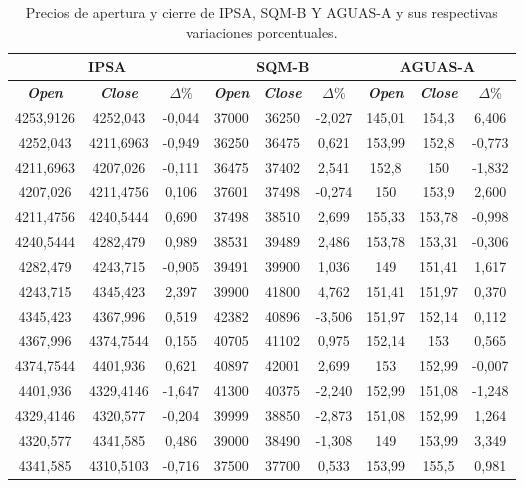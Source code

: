 \documentclass[12pt,letter,spanish]{article}
\begin{document}
\begin{table}[H]
\renewcommand\thetable{A3.1} 
\caption{Precios de apertura y cierre de IPSA, SQM-B Y AGUAS-A y sus respectivas variaciones porcentuales.}
\begin{tabular}{|c|c|c|c|c|c|c|c|c|}
\hline
\multicolumn{3}{|c|}{IPSA} & \multicolumn{3}{c|}{SQM-B} & \multicolumn{3}{c|}{AGUAS-A} \\ \hline
\textit{\textbf{Open}} & \textit{\textbf{Close}} & \textit{\textbf{$\Delta \%$}} & \textit{\textbf{Open}} & \textit{\textbf{Close}} & \textit{\textbf{$\Delta \%$}} & \textit{\textbf{Open}} & \textit{\textbf{Close}} & \textit{\textbf{$\Delta \%$}} \\ \hline
4253,9126 & 4252,043 & -0,044 & 37000 & 36250 & -2,027 & 145,01 & 154,3 & 6,406 \\ \hline
4252,043 & 4211,6963 & -0,949 & 36250 & 36475 & 0,621 & 153,99 & 152,8 & -0,773 \\ \hline
4211,6963 & 4207,026 & -0,111 & 36475 & 37402 & 2,541 & 152,8 & 150 & -1,832 \\ \hline
4207,026 & 4211,4756 & 0,106 & 37601 & 37498 & -0,274 & 150 & 153,9 & 2,600 \\ \hline
4211,4756 & 4240,5444 & 0,690 & 37498 & 38510 & 2,699 & 155,33 & 153,78 & -0,998 \\ \hline
4240,5444 & 4282,479 & 0,989 & 38531 & 39489 & 2,486 & 153,78 & 153,31 & -0,306 \\ \hline
4282,479 & 4243,715 & -0,905 & 39491 & 39900 & 1,036 & 149 & 151,41 & 1,617 \\ \hline
4243,715 & 4345,423 & 2,397 & 39900 & 41800 & 4,762 & 151,41 & 151,97 & 0,370 \\ \hline
4345,423 & 4367,996 & 0,519 & 42382 & 40896 & -3,506 & 151,97 & 152,14 & 0,112 \\ \hline
4367,996 & 4374,7544 & 0,155 & 40705 & 41102 & 0,975 & 152,14 & 153 & 0,565 \\ \hline
4374,7544 & 4401,936 & 0,621 & 40897 & 42001 & 2,699 & 153 & 152,99 & -0,007 \\ \hline
4401,936 & 4329,4146 & -1,647 & 41300 & 40375 & -2,240 & 152,99 & 151,08 & -1,248 \\ \hline
4329,4146 & 4320,577 & -0,204 & 39999 & 38850 & -2,873 & 151,08 & 152,99 & 1,264 \\ \hline
4320,577 & 4341,585 & 0,486 & 39000 & 38490 & -1,308 & 149 & 153,99 & 3,349 \\ \hline
4341,585 & 4310,5103 & -0,716 & 37500 & 37700 & 0,533 & 153,99 & 155,5 & 0,981 \\ \hline

\end{tabular}
\end{table}
\end{document}
